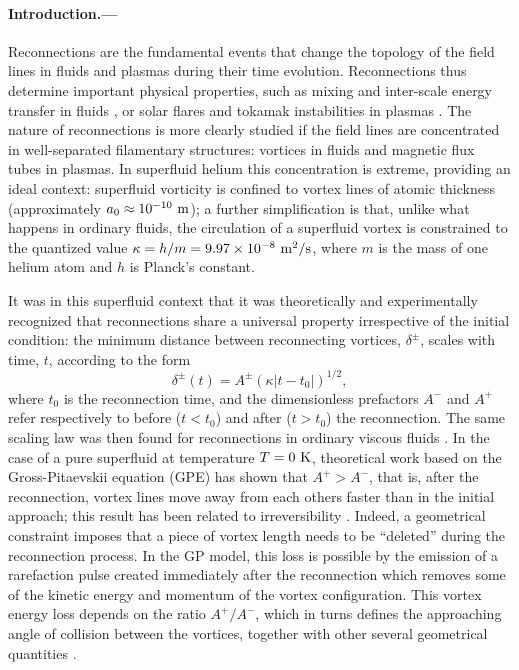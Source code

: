 \documentclass[%
superscriptaddress,
 amsmath,amssymb,
 aps,
]{revtex4-2}
\begin{document}
\paragraph*{Introduction.---} Reconnections are the fundamental events that
change the topology of the field lines in fluids and plasmas during their
time evolution. Reconnections
thus determine important physical properties, 
such as mixing and inter-scale energy transfer in fluids \cite{YaoHussainAnnRev2022}, 
or solar flares and tokamak instabilities
in plasmas \cite{Chapman2010}. The nature of reconnections is more clearly
studied if the field lines are concentrated in well-separated
filamentary structures:
vortices in fluids and magnetic flux tubes in plasmas. In superfluid 
helium this concentration is extreme, providing an ideal context:
superfluid vorticity is confined to vortex lines of atomic thickness 
(approximately $a_0 \approx 10^{-10}~\rm m$); a further simplification 
is that, unlike what happens in ordinary fluids, the
circulation of a superfluid vortex  is constrained to the quantized value
$\kappa=h/m=9.97 \times 10^{-8}~\rm m^2/s$, 
where $m$ is the mass of one helium atom and $h$ is Planck's constant. 

It was in this superfluid context that it was theoretically and experimentally recognized
\cite{nazarenko2003,bewley2008,paoletti2010,zuccherQuantumVortexReconnections2012a,villoisUniversalNonuniversalAspects2017a,galantucciCrossoverInteractionDriven2019a}
that reconnections share a universal property irrespective of the initial
condition: the minimum distance between reconnecting 
vortices, $\delta^{\pm}$, scales with time, $t$, according to the form
\begin{equation}
\label{eq:scaling}
	\delta^{\pm}(t) = A^{\pm} (\kappa|t-t_0|)^{1/2},
\end{equation} 
\noindent
where $t_0$ is the reconnection time, and the dimensionless
prefactors $A^-$ and $A^+$ refer respectively to before
($t<t_0$) and after ($t>t_0$) the reconnection. The same scaling law
was then found for reconnections in ordinary viscous fluids 
\cite{yaoSeparationScalingViscous2020}. In the case of a pure
superfluid at temperature $T=0~\rm K$, theoretical work based on
the Gross-Pitaevskii equation (GPE) has shown that
$A^+>A^-$, that is, after the reconnection, vortex lines move away from 
each others faster than in the initial approach; this result has been
related to irreversibility \cite{villoisIrreversibleDynamicsVortex2020,promentMatchingTheoryCharacterize2020}. Indeed, a geometrical constraint imposes 
\cite{promentMatchingTheoryCharacterize2020}
that a piece of vortex length needs to be ``deleted'' 
during the reconnection process. In the GP model, this loss is possible 
by the emission of a rarefaction pulse created immediately after 
the reconnection
\cite{leadbeaterSoundEmissionDue2001b,zuccherQuantumVortexReconnections2012a} which removes some of the kinetic energy and momentum of the vortex configuration.
This vortex energy loss depends on
the ratio $A^+/A^-$, which in turns defines the approaching angle of collision
between the vortices, together with other several geometrical quantities \cite{villoisUniversalNonuniversalAspects2017a,promentMatchingTheoryCharacterize2020}. 
\end{document}

